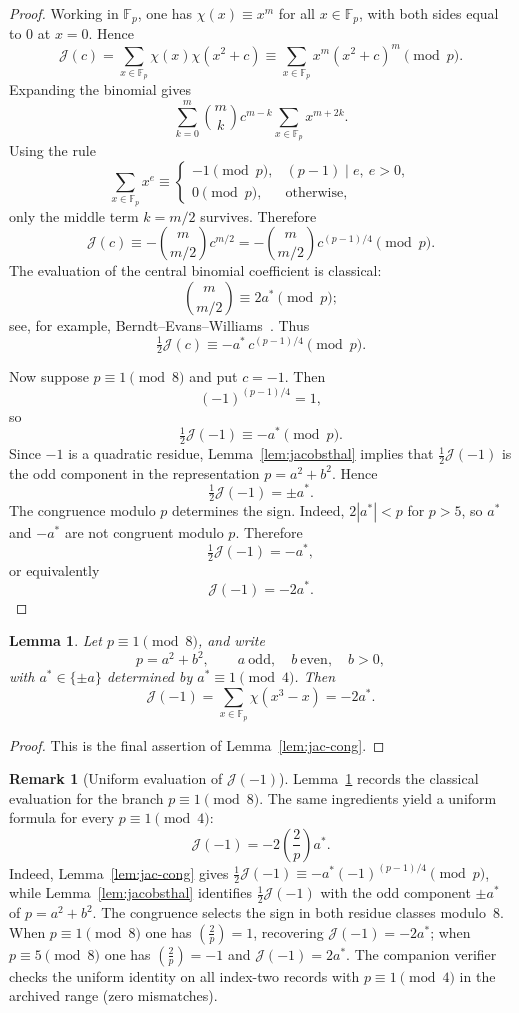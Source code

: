 \documentclass[11pt]{amsart}
\theoremstyle{plain}
\newtheorem{lemma}[theorem]{Lemma}
\theoremstyle{definition}
\newtheorem{remark}[theorem]{Remark}
\newcommand{\leg}[2]{\left(\frac{#1}{#2}\right)}
\newcommand{\Jac}{\mathcal{J}}
\begin{document}
\begin{proof}
Working in $\mathbb F_p$, one has $\chi(x)\equiv x^m$ for all $x\in\mathbb F_p$,
with both sides equal to $0$ at $x=0$. Hence
\[
  \Jac(c)
  =
  \sum_{x\in\mathbb F_p}\chi(x)\chi(x^2+c)
  \equiv
  \sum_{x\in\mathbb F_p}x^m(x^2+c)^m
  \pmod p.
\]
Expanding the binomial gives
\[
  \sum_{k=0}^{m}\binom{m}{k}c^{m-k}
  \sum_{x\in\mathbb F_p}x^{m+2k}.
\]
Using the rule
\[
  \sum_{x\in\mathbb F_p}x^e\equiv
  \begin{cases}
    -1\pmod p,& (p-1)\mid e,\ e>0,\\
    0\pmod p,& \text{otherwise},
  \end{cases}
\]
only the middle term $k=m/2$ survives. Therefore
\[
  \Jac(c)\equiv
  -\binom{m}{m/2}c^{m/2}
  =
  -\binom{m}{m/2}c^{(p-1)/4}
  \pmod p.
\]
The evaluation of the central binomial coefficient is classical:
\[
  \binom{m}{m/2}\equiv 2a^{*}\pmod p;
\]
see, for example, Berndt--Evans--Williams~\cite[Chapters~6 and~9]{BEW}.
Thus
\[
  \tfrac12\Jac(c)\equiv -a^{*}\,c^{(p-1)/4}\pmod p.
\]

Now suppose $p\equiv1\pmod8$ and put $c=-1$. Then
\[
  (-1)^{(p-1)/4}=1,
\]
so
\[
  \tfrac12\Jac(-1)\equiv -a^{*}\pmod p.
\]
Since $-1$ is a quadratic residue, Lemma~\ref{lem:jacobsthal} implies that
$\tfrac12\Jac(-1)$ is the odd component in the representation
$p=a^2+b^2$. Hence
\[
  \tfrac12\Jac(-1)=\pm a^{*}.
\]
The congruence modulo $p$ determines the sign. Indeed, $2|a^{*}|<p$ for
$p>5$, so $a^{*}$ and $-a^{*}$ are not congruent modulo $p$. Therefore
\[
  \tfrac12\Jac(-1)=-a^{*},
\]
or equivalently
\[
  \Jac(-1)=-2a^{*}.
\]
\end{proof}

\begin{lemma}\label{lem:Jminus1}
Let $p\equiv1\pmod8$, and write
\[
  p=a^2+b^2,\qquad a\ \text{odd},\quad b\ \text{even},\quad b>0,
\]
with $a^{*}\in\{\pm a\}$ determined by $a^{*}\equiv1\pmod4$. Then
\[
  \Jac(-1)=\sum_{x\in\mathbb F_p}\chi(x^3-x)=-2a^{*}.
\]
\end{lemma}

\begin{proof}
This is the final assertion of Lemma~\ref{lem:jac-cong}.
\end{proof}

\begin{remark}[Uniform evaluation of $\Jac(-1)$]\label{rem:jac-m1-uniform}
Lemma~\ref{lem:Jminus1} records the classical evaluation for the branch
$p\equiv1\pmod8$. The same ingredients yield a uniform formula for every
$p\equiv1\pmod4$:
\[
  \Jac(-1)=-2\left(\frac2p\right)a^{*}.
\]
Indeed, Lemma~\ref{lem:jac-cong} gives
$\tfrac12\Jac(-1)\equiv -a^{*}(-1)^{(p-1)/4}\pmod p$, while
Lemma~\ref{lem:jacobsthal} identifies $\tfrac12\Jac(-1)$ with the odd
component $\pm a^{*}$ of $p=a^2+b^2$. The congruence selects the sign in
both residue classes modulo~$8$. When $p\equiv1\pmod8$ one has
$\leg2p=1$, recovering $\Jac(-1)=-2a^{*}$; when $p\equiv5\pmod8$ one has
$\leg2p=-1$ and $\Jac(-1)=2a^{*}$. The companion verifier checks the
uniform identity on all index-two records with $p\equiv1\pmod4$ in the
archived range (zero mismatches).
\end{remark}
\end{document}
